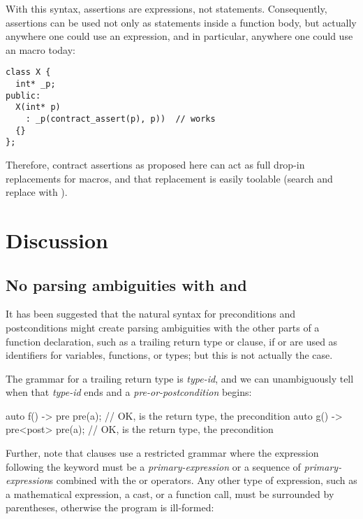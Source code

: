 With this syntax, assertions are expressions, not statements. Consequently, assertions can be used not only as statements inside a function body, but actually anywhere one could use an expression, and in particular, anywhere one could use an  macro today:

\begin{lstlisting}
class X {
  int* _p;
public:
  X(int* p)
    : _p(contract_assert(p), p))  // works
  {}
};
\end{lstlisting}

Therefore, contract assertions as proposed here can act as full drop-in replacements for  macros, and that replacement is easily toolable (search and replace  with ).

\section{Discussion}

\subsection{No parsing ambiguities with  and }
\label{subsec:noambig}

It has been suggested that the natural syntax for preconditions and postconditions might create parsing ambiguities with the other parts of a function declaration, such as a trailing return type or  clause, if  or  are used as identifiers for variables, functions, or types; but this is not actually the case.

The grammar for a trailing return type is \tcode{->} \emph{type-id}, and we can unambiguously tell when that \emph{type-id} ends and a \emph{pre-or-postcondition} begins:

\begin{codeblock}
auto f() -> pre pre(a);   // OK,  is the return type,  the precondition
auto g() -> pre<post> pre(a);  // OK,  is the return type,  the precondition
\end{codeblock}

Further, note that  clauses use a restricted grammar where the expression following the  keyword must be a \emph{primary-expression} or a sequence of \emph{primary-expression}s combined with the \tcode{\&\&} or \tcode{||} operators. Any other type of expression, such as a mathematical expression, a cast, or a function call, must be surrounded by parentheses, otherwise the program is ill-formed:

